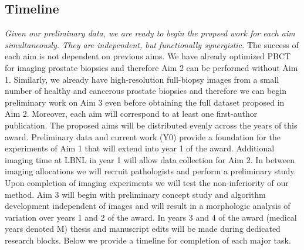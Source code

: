 \documentclass{NIHGrant}
\theoremstyle{theorem}
\begin{document}
\subsection*{Timeline}
%
\emph{Given our preliminary data, we are ready to begin the propsed work for each aim simultaneously. They are independent, but functionally synergistic.} The success of each aim is not dependent on previous aims. We have already optimized PBCT for imaging prostate biopsies and therefore Aim 2 can be performed without Aim 1. Similarly, we already have high-resolution full-biopsy images from a small number of healthy and cancerous prostate biopsies and therefore we can begin preliminary work on Aim 3 even before obtaining the full dataset proposed in Aim 2. Moreover, each aim will correspond to at least one first-author publication. The proposed aims will be distributed evenly across the years of this award. Preliminary data and current work (Y0) provide a foundation for the experiments of Aim 1 that will extend into year 1 of the award. Additional imaging time at LBNL in year 1 will allow data collection for Aim 2. In between imaging allocations we will recruit pathologists and perform a preliminary study. Upon completion of imaging experiments we will test the non-inferiority of our method. Aim 3 will begin with preliminary concept study and algorithm development independent of images and will result in a morphologic analysis of variation over years 1 and 2 of the award. In years 3 and 4 of the award (medical years denoted M) thesis and manuscript edits will be made during dedicated research blocks. Below we provide a timeline for completion of each major task.
\end{document}
